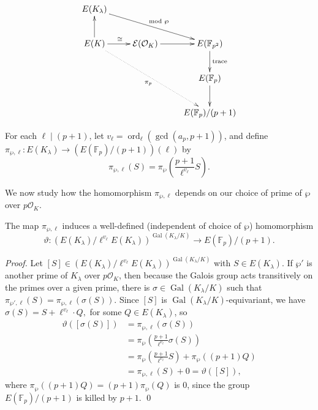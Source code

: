 \documentclass{oupau}
\DeclareMathOperator{\Gal}{Gal}
\DeclareMathOperator{\ord}{ord}
\newcommand{\isom}{\cong}
\newcommand{\FF}{\mathbb{F}}
\newcommand{\OO}{\mathcal{O}}
\begin{document}
$$
\xymatrix{
E(K_{\lambda})\ar[drr]^{\mod{\wp}} &          & \\
E(K)\ar[u]\ar[r]^{\isom}\ar@{.>}[ddrr]_{\pi_p} & \mathcal{E}(\OO_K)\ar[r] & E(\FF_{p^2})\ar[d]^{{\rm trace}} \\
     &                    & E(\FF_p)\ar[d] \\ 
     &                    & E(\FF_p)/(p+1)\\
}
$$

For each $\ell\mid (p+1)$, let 
$v_{\ell} = \ord_{\ell}(\gcd(a_p, p+1))$,
and define
$\pi_{\wp,\ell} : E(K_{\lambda}) \to (E(\FF_{p})/(p+1)) (\ell)$
by
$$
  \pi_{\wp,\ell}(S) = \pi_{\wp}\left(\frac{p+1}{\ell^{v_\ell}} S \right).
$$

We now study how the homomorphism $\pi_{\wp,\ell}$ depends on our
choice of prime of $\wp$ over $p\OO_K$. 

\begin{proposition}\label{prop:piplambdaell}
The map $\pi_{\wp,\ell}$ induces a well-defined (independent of choice
of $\wp$) homomorphism
$$
  \vartheta : \left(E(K_{\lambda})/ \ell^{v_{\ell}} E(K_{\lambda})\right)^{\Gal(K_{\lambda}/K)}
    \to E(\FF_p) / (p+1).
$$
\end{proposition}
\begin{proof}
Let $[S] \in \left(E(K_{\lambda})/ \ell^{v_{\ell}} E(K_{\lambda})\right)^{\Gal(K_{\lambda}/K)}$
with $S\in E(K_{\lambda})$.
If $\wp'$ is another prime of $K_{\lambda}$ over $p\OO_K$, then because the Galois group
acts transitively on the primes over a given prime, there
is $\sigma\in \Gal(K_{\lambda}/K)$ such that
$\pi_{\wp',\ell}(S) = \pi_{\wp,\ell}(\sigma(S))$.
Since $[S]$ is $\Gal(K_{\lambda}/K)$-equivariant, we have
$
  \sigma(S) = S + \ell^{v_{\ell}} \cdot Q,
$
for some $Q\in E(K_{\lambda})$, so
\begin{align*}
\vartheta([\sigma(S)]) &= \pi_{\wp,\ell}(\sigma(S))\\
& =  \pi_{\wp}\left(\frac{p+1}{\ell^{v_\ell}} \sigma(S) \right)\\
 &=
 \pi_{\wp}\left(\frac{p+1}{\ell^{v_\ell}} S \right) + \pi_{\wp}((p+1)Q)\\
& = 
\pi_{\wp,\ell}(S) + 0 = \vartheta([S]),
\end{align*}
where $\pi_{\wp}((p+1)Q) = (p+1)\pi_{\wp}(Q)$ is $0$, since the
group $E(\FF_p)/(p+1)$ is killed by $p+1$. 
\qed\end{proof}
\end{document}
